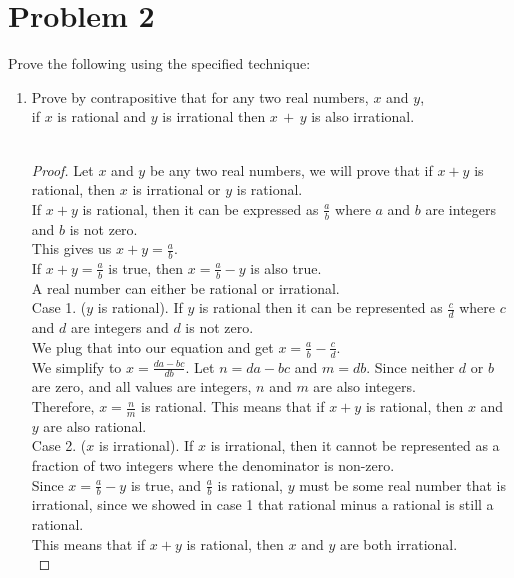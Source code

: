 \documentclass{amsart}
\theoremstyle{definition}
\theoremstyle{Exercise}
\theoremstyle{remark}
\theoremstyle{rule}
\numberwithin{equation}{section}
\begin{document}
  \section*{Problem 2}
  Prove the following using the specified technique:
  \begin{enumerate}[label=(\alph*)]
    \item Prove by contrapositive that for any two real numbers, $x$ and $y$,\\
         if $x$ is rational and $y$ is irrational then $x\, +\, y$ is also irrational.
          \\\\
  \begin{proof}
  Let $x$ and $y$ be any two real numbers, we will prove that if $x + y$ is rational, then $x$ is irrational or $y$ is rational.\\
  If $x + y$ is rational, then it can be expressed as $\frac{a}{b}$ where $a$ and $b$ are integers and $b$ is not zero.\\
  This gives us $x + y = \frac{a}{b}$.\\
  If $x + y = \frac{a}{b}$ is true, then $x = \frac{a}{b} - y$ is also true.\\
  A real number can either be rational or irrational. \\
  Case 1. ($y$ is rational).
  If $y$ is rational then it can be represented as $\frac{c}{d}$ where $c$ and $d$ are integers and $d$ is not zero.\\
  We plug that into our equation and get $x = \frac{a}{b} - \frac{c}{d}$.\\
  We simplify to $x = \frac{da-bc}{db}$. Let $n = da-bc$ and $m = db$. Since neither $d$ or $b$ are zero, and all values are integers, $n$ and $m$ are also integers.\\
  Therefore, $x = \frac{n}{m}$ is rational. This means that if $x + y$ is rational, then $x$ and $y$ are also rational.\\
  Case 2. ($x$ is irrational).
  If $x$ is irrational, then it cannot be represented as a fraction of two integers where the denominator is non-zero.\\
  Since $x = \frac{a}{b} - y$ is true, and $\frac{a}{b}$ is rational, $y$ must be some real number that is irrational, since we showed in case 1 that rational minus a rational is still a rational.\\
  This means that if $x + y$ is rational, then $x$ and $y$ are both irrational.\\

\end{proof}
\end{enumerate}
\end{document}
